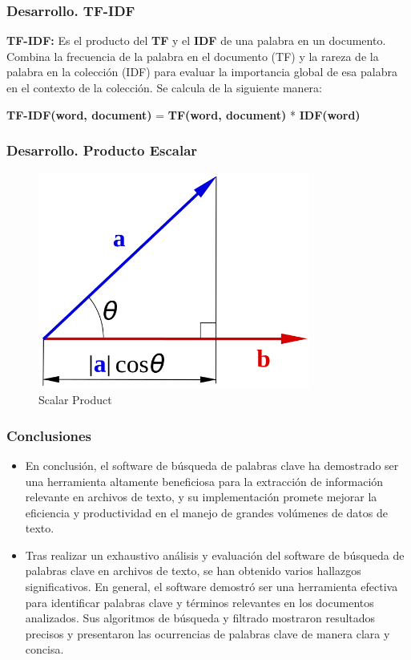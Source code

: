 \documentclass{beamer}
\begin{document}
    \begin{frame}
        \frametitle{Desarrollo. TF-IDF}
        \textbf{TF-IDF:} Es el producto del \textbf{TF} y el \textbf{IDF} de una palabra en un documento. Combina la frecuencia de la palabra en el documento (TF) y la rareza de la palabra en la colección (IDF) para evaluar la importancia global de esa palabra en el contexto de la colección. Se calcula de la siguiente manera:

        \textbf{TF-IDF(word, document)} = \textbf{TF(word, document)} * \textbf{IDF(word)}
    \end{frame}

    \begin{frame}
        \frametitle{Desarrollo. Producto Escalar}
        \begin{figure}
            \centering
            \includegraphics[width=0.8\textwidth]{605px-Scalar-product-dot-product.svg.png}
            \caption{Scalar Product}
        \end{figure}
    \end{frame}

    \begin{frame}
        \frametitle{Conclusiones}
        \begin{itemize}
            \item En conclusión, el software de búsqueda de palabras clave ha demostrado ser una herramienta altamente beneficiosa para la extracción de información relevante en archivos de texto, y su implementación promete mejorar la eficiencia y productividad en el manejo de grandes volúmenes de datos de texto.
            \item Tras realizar un exhaustivo análisis y evaluación del software de búsqueda de palabras clave en archivos de texto, se han obtenido varios hallazgos significativos. En general, el software demostró ser una herramienta efectiva para identificar palabras clave y términos relevantes en los documentos analizados. Sus algoritmos de búsqueda y filtrado mostraron resultados precisos y presentaron las ocurrencias de palabras clave de manera clara y concisa.
        \end{itemize}
    \end{frame}
    
\end{document}
